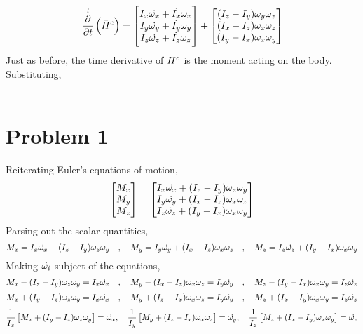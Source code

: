 \documentclass[class=report, 12pt, crop=false]{standalone}
\begin{document}
\begin{center}
$$\overset{i}{\frac{\partial}{\partial t}}\left(\bar{H}^c\right) = 
\begin{bmatrix}
I_x\dot{\omega_x}+\dot{I_x}\omega_x \\
I_y\dot{\omega_y}+\dot{I_y}\omega_y \\
I_z\dot{\omega_z}+\dot{I_z}\omega_z
\end{bmatrix} + \begin{bmatrix}
(I_{z} - I_{y})\omega_y\omega_z \\
(I_{x} - I_{z})\omega_x\omega_z \\
(I_{y} - I_{x})\omega_x\omega_y
\end{bmatrix}$$
Just as before, the time derivative of $\bar{H}^c$ is the moment acting on the body. Substituting,
\\~\\








\section{Problem 1}
\begin{comment}
\end{comment}
Reiterating Euler's equations of motion,
$$\begin{bmatrix}M_x \\ M_y \\ M_z\end{bmatrix} = \begin{bmatrix} 
I_{x}\dot{\omega_x} + (I_{z} - I_{y})\omega_z\omega_y\\
I_{y}\dot{\omega_y} + (I_{x} - I_{z})\omega_x\omega_z\\
I_{z}\dot{\omega_z} + (I_{y} - I_{x})\omega_x\omega_y
\end{bmatrix}$$
Parsing out the scalar quantities,
$$M_x=I_{x}\dot{\omega_x} + (I_{z} - I_{y})\omega_z\omega_y \quad,\quad M_y=I_{y}\dot{\omega_y} + (I_{x} - I_{z})\omega_x\omega_z \quad,\quad M_z=I_{z}\dot{\omega_z} + (I_{y} - I_{x})\omega_x\omega_y$$
Making $\dot{\omega_i}$ subject of the equations,
$$M_x - (I_{z} - I_{y})\omega_z\omega_y=I_{x}\dot{\omega_x} \quad,\quad M_y - (I_{x} - I_{z})\omega_x\omega_z=I_{y}\dot{\omega_y} \quad,\quad M_z - (I_{y} - I_{x})\omega_x\omega_y=I_{z}\dot{\omega_z}$$
$$M_x+(I_{y}-I_{z})\omega_z\omega_y = I_{x}\dot{\omega_x} \quad,\quad M_y+(I_{z}-I_{x})\omega_x\omega_z = I_{y}\dot{\omega_y} \quad,\quad M_z+(I_{x}-I_{y})\omega_x\omega_y = I_{z}\dot{\omega_z}$$
$$\frac{1}{I_{x}}\left[M_x+(I_{y}-I_{z})\omega_z\omega_y\right] = \dot{\omega_x} ,\quad \frac{1}{I_{y}}\left[M_y+(I_{z}-I_{x})\omega_x\omega_z\right] = \dot{\omega_y} ,\quad \frac{1}{I_{z}}\left[M_z+(I_{x}-I_{y})\omega_x\omega_y\right] = \dot{\omega_z}$$



\end{center}
\end{document}
